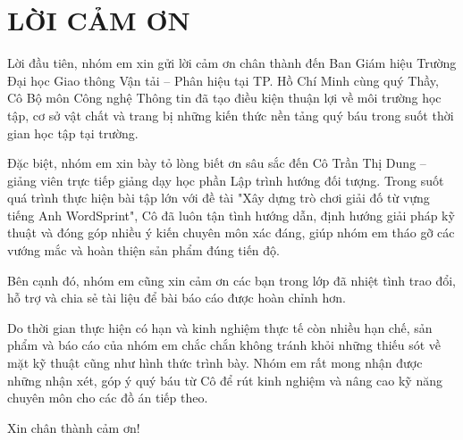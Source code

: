 
\chapter*{LỜI CẢM ƠN}
 
Lời đầu tiên, nhóm em xin gửi lời cảm ơn chân thành đến Ban Giám hiệu Trường Đại học Giao thông Vận tải – Phân hiệu tại TP. Hồ Chí Minh cùng quý Thầy, Cô Bộ môn Công nghệ Thông tin đã tạo điều kiện thuận lợi về môi trường học tập, cơ sở vật chất và trang bị những kiến thức nền tảng quý báu trong suốt thời gian học tập tại trường.

Đặc biệt, nhóm em xin bày tỏ lòng biết ơn sâu sắc đến Cô Trần Thị Dung – giảng viên trực tiếp giảng dạy học phần Lập trình hướng đối tượng. Trong suốt quá trình thực hiện bài tập lớn với đề tài "Xây dựng trò chơi giải đố từ vựng tiếng Anh WordSprint", Cô đã luôn tận tình hướng dẫn, định hướng giải pháp kỹ thuật và đóng góp nhiều ý kiến chuyên môn xác đáng, giúp nhóm em tháo gỡ các vướng mắc và hoàn thiện sản phẩm đúng tiến độ.

Bên cạnh đó, nhóm em cũng xin cảm ơn các bạn trong lớp \studentclass đã nhiệt tình trao đổi, hỗ trợ và chia sẻ tài liệu để bài báo cáo được hoàn chỉnh hơn.

Do thời gian thực hiện có hạn và kinh nghiệm thực tế còn nhiều hạn chế, sản phẩm và báo cáo của nhóm em chắc chắn không tránh khỏi những thiếu sót về mặt kỹ thuật cũng như hình thức trình bày. Nhóm em rất mong nhận được những nhận xét, góp ý quý báu từ Cô để rút kinh nghiệm và nâng cao kỹ năng chuyên môn cho các đồ án tiếp theo.

Xin chân thành cảm ơn!
